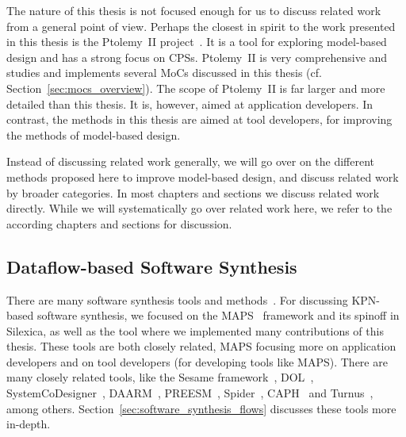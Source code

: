 The nature of this thesis is not focused enough for us to discuss related work from a general point of view.
Perhaps the closest in spirit to the work presented in this thesis is the Ptolemy~II project~\cite{Ptolemaeus:14:SystemDesign}.
It is a tool for exploring model-based design and has a strong focus on \acp{CPS}.
Ptolemy~II is very comprehensive and studies and implements several \acp{MoC} discussed in this thesis (cf. Section~\ref{sec:mocs_overview}).
The scope of Ptolemy~II is far larger and more detailed than this thesis.
It is, however, aimed at application developers.
In contrast, the methods in this thesis are aimed at tool developers, for improving the methods of model-based design.

Instead of discussing related work generally, we will go over on the different methods proposed here to improve model-based design, and discuss related work by broader categories.
In most chapters and sections we discuss related work directly.
While we will systematically go over related work here, we refer to the according chapters and sections for discussion.

\subsection{Dataflow-based Software Synthesis}

There are many software synthesis tools and methods~\cite{lin1998softwaresynthesis,ritz1992softwaresynthesis,bhartacharyya2000softwaresynthesis,pino1995softwaresynthesis,bhattacharyya2012softwaresynthesis}.
For discussing \ac{KPN}-based software synthesis, we focused on the \ac{MAPS}~\cite{maps} framework and its spinoff in Silexica, as well as the \mocasin tool where we implemented many contributions of this thesis.
These tools are both closely related, \ac{MAPS} focusing more on application developers and \mocasin on tool developers (for developing tools like \ac{MAPS}).
There are many closely related tools, like the Sesame framework~\cite{pimentel2006systematic}, \ac{DOL}~\cite{thiele2007DOL}, SystemCoDesigner~\cite{haubelt2008systemcodesigner}, DAARM~\cite{weichslgartner2014daarm}, PREESM~\cite{pelcat2014preesm}, Spider~\cite{heulot2014spider}, CAPH~\cite{serot2013caph} and Turnus~\cite{casale2013turnus}, among others.
Section~\ref{sec:software_synthesis_flows} discusses these tools more in-depth.



